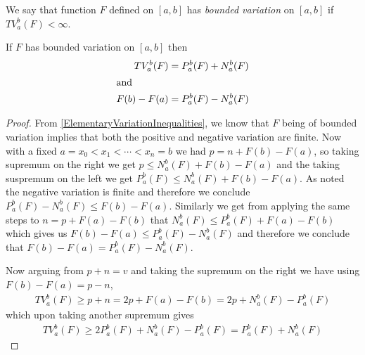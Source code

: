 \begin{defn}We say that  function $F$ defined on $[a,b]$ has
  \emph{bounded variation} on $[a,b]$ if $TV_a^b(F) < \infty$.
\end{defn}

\begin{lem}\label{TotalVariationAsSumOfPositiveAndNegativeVariation}If $F$ has bounded variation on $[a,b]$ then 
\begin{align*}
TV_a^b(F) &= P_a^b(F) + N_a^b(F) \\
\intertext{and}
F(b) - F(a) &=  P_a^b(F) - N_a^b(F) 
\end{align*}
\end{lem}
\begin{proof}
From \ref{ElementaryVariationInequalities}, we know that $F$ being of
bounded variation implies that both the positive and negative
variation are finite.  Now with a fixed $a=x_0 < x_1 < \dotsb < x_n=b$
we had $p  = n + F(b) - F(a)$, so taking supremum on the right we get
$p  \leq N_a^b(F) + F(b) - F(a)$
and the taking suspremum on the left we get $P_a^b(F)  \leq N_a^b(F) +
F(b) - F(a)$.  As noted the negative variation is finite and therefore
we conclude $P_a^b(F)  - N_a^b(F) \leq
F(b) - F(a)$. Similarly we get from applying the same steps to $n = p
+ F(a) - F(b)$
that $N_a^b(F) \leq P_a^b(F) + F(a) - F(b)$ which gives us $F(b) -F(a)
\leq P_a^b(F)  - N_a^b(F)$ and therefore we conclude that $F(b) -F(a)
= P_a^b(F)  - N_a^b(F)$.

Now arguing from $p + n = v$ and taking the supremum on the right we
have using $F(b) - F(a) = p -n$,
\begin{align*}
TV_a^b(F) \geq p+n = 2p + F(a) - F(b) = 2p + N_a^b(F) - P_a^b(F)
\end{align*}
which upon taking another supremum gives
\begin{align*}
TV_a^b(F) \geq 2P_a^b(F) + N_a^b(F) - P_a^b(F) = P_a^b(F) + N_a^b(F)
\end{align*}


\end{proof}
